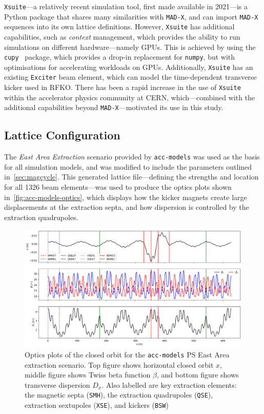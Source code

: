 \documentclass[a4paper,twoside,11pt]{report}
\begin{document}
\verb|Xsuite|---a relatively recent simulation tool, first made available in 2021---is a Python package that shares many similarities with \verb|MAD-X|, and can import \verb|MAD-X| sequences into its own lattice definitions. However, \verb|Xsuite| has additional capabilities, such as \textit{context} management, which provides the ability to run simulations on different hardware---namely GPUs. This is achieved by using the \verb|cupy|~\cite{CuPy} package, which provides a drop-in replacement for \verb|numpy|, but with optimisations for accelerating workloads on GPUs. Additionally, \verb|Xsuite| has an existing \verb|Exciter| beam element, which can model the time-dependent transverse kicker used in RFKO. There has been a rapid increase in the use of \verb|Xsuite| within the accelerator physics community at CERN, which---combined with the additional capabilities beyond \verb|MAD-X|---motivated its use in this study.

\subsection{Lattice Configuration} %

The \textit{East Area Extraction} scenario provided by \verb|acc-models| was used as the basis for all simulation models, and was modified to include the parameters outlined in~\autoref{sec:magcycle}. This generated lattice file---defining the strengths and location for all 1326 beam elements---was used to produce the optics plots shown in~\autoref{fig:acc-models-optics}, which displays how the kicker magnets create large displacements at the extraction septa, and how dispersion is controlled by the extraction quadrupoles.

\begin{figure}[h]
  \centering
  \includegraphics[width=0.9\linewidth]{optics.png}
  \cprotect\caption[Closed-orbit optics plots of the PS EA extraction model]{Optics plots of the closed orbit for the \verb|acc-models| PS East Area extraction scenario. Top figure shows horizontal closed orbit $x$, middle figure shows Twiss beta function $\beta$, and bottom figure shows transverse dispersion $D_x$. Also labelled are key extraction elements: the magnetic septa (\verb|SMH|), the extraction quadrupoles (\verb|QSE|), extraction sextupoles (\verb|XSE|), and kickers (\verb|BSW|)}\label{fig:acc-models-optics}
\end{figure}
\end{document}
